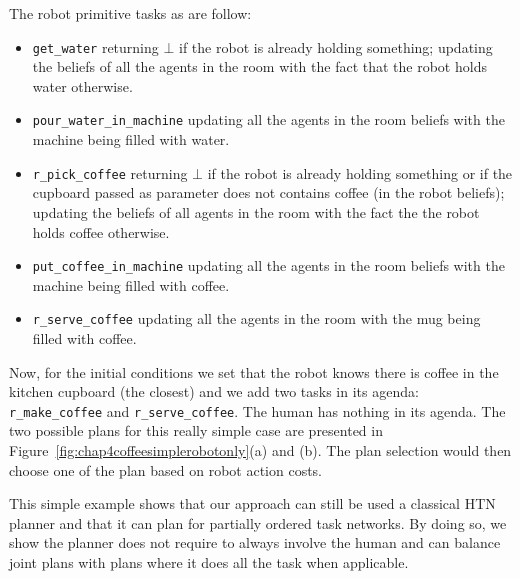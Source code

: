 \documentclass[a4paper,11pt,twoside]{StyleThese}
\begin{document}
The robot primitive tasks as are follow:
\begin{itemize}
\item \verb'get_water' returning $\bot$ if the robot is already holding something; updating the beliefs of all the agents in the room with the fact that the robot holds water otherwise.
\item \verb'pour_water_in_machine' updating all the agents in the room beliefs with the machine being filled with water.
\item \verb'r_pick_coffee' returning $\bot$ if the robot is already holding something or if the cupboard passed as parameter does not contains coffee (in the robot beliefs); updating the beliefs of all agents in the room with the fact the the robot holds coffee otherwise.
\item \verb'put_coffee_in_machine' updating all the agents in the room beliefs with the machine being filled with coffee.
\item \verb'r_serve_coffee' updating all the agents in the room with the mug being filled with coffee.
\end{itemize}

Now, for the initial conditions we set that the robot knows there is coffee in the kitchen cupboard (the closest) and we add two tasks in its agenda: \verb'r_make_coffee' and \verb'r_serve_coffee'. The human has nothing in its agenda. The two possible plans for this really simple case are presented in Figure~\ref{fig:chap4coffeesimplerobotonly}(a) and (b). The plan selection would then choose one of the plan based on robot action costs.

This simple example shows that our approach can still be used a classical HTN planner and that it can plan for partially ordered task networks. By doing so, we show the planner does not require to always involve the human and can balance joint plans with plans where it does all the task when applicable.
\end{document}
